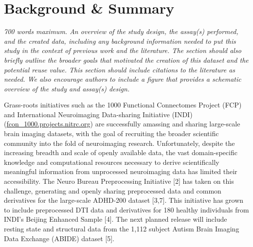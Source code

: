 \section{Background & Summary} 
\textit{700 words maximum. An overview of the study design, the assay(s) performed, and the created data, including any background information needed to put this study in the context of previous work and the literature. The section should also briefly outline the broader goals that motivated the creation of this dataset and the potential reuse value.  This section should include citations to the literature as needed.  We also encourage authors to include a figure that provides a schematic overview of the study and assay(s) design.} 


 Grass-roots initiatives such as the 1000 Functional Connectomes Project (FCP)
		    and International Neuroimaging Data-sharing Initiative (INDI) (\href{http://fcon_1000.projects.nitrc.org}{fcon\_1000.projects.nitrc.org}) are
successfully amassing and sharing large-scale brain imaging datasets, with the
goal of recruiting the broader scientific community into the fold of
neuroimaging research. Unfortunately, despite the increasing breadth and scale
of openly available data, the vast domain-specific knowledge and computational
resources necessary to derive scientifically meaningful information from
unprocessed neuroimaging data has limited their accessibility. The Neuro Bureau
Preprocessing Initiative [2] has taken on this challenge,
generating and openly sharing preprocessed data and common derivatives for the
large-scale ADHD-200 dataset [3,7]. This initiative has grown to
include preprocessed DTI data and derivatives for 180 healthy individuals from
INDI's Beijing Enhanced Sample [4]. The next planned release will
include resting state and structural data from the 1,112 subject Autism Brain
Imaging Data Exchange (ABIDE) dataset [5].